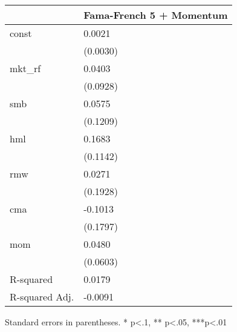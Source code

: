 \begin{table}
\caption{}
\label{}
\begin{center}
\begin{tabular}{ll}
\hline
               & Fama-French 5 + Momentum  \\
\hline
const          & 0.0021                    \\
               & (0.0030)                  \\
mkt\_rf        & 0.0403                    \\
               & (0.0928)                  \\
smb            & 0.0575                    \\
               & (0.1209)                  \\
hml            & 0.1683                    \\
               & (0.1142)                  \\
rmw            & 0.0271                    \\
               & (0.1928)                  \\
cma            & -0.1013                   \\
               & (0.1797)                  \\
mom            & 0.0480                    \\
               & (0.0603)                  \\
R-squared      & 0.0179                    \\
R-squared Adj. & -0.0091                   \\
\hline
\end{tabular}
\end{center}
\end{table}
\bigskip
Standard errors in parentheses. \newline 
* p<.1, ** p<.05, ***p<.01